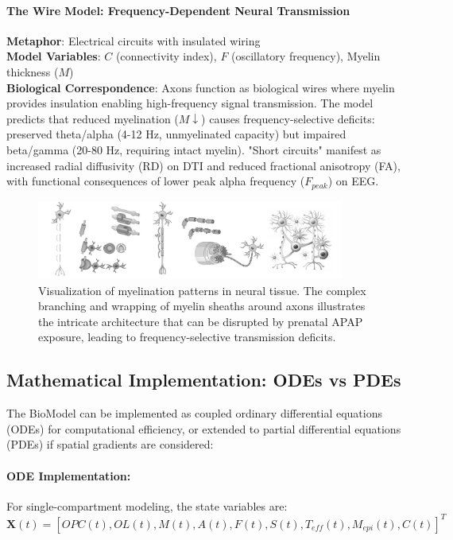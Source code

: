 \documentclass[11pt]{article}
\let\oldsubsection\subsection
\renewcommand{\subsection}[1]{\oldsubsection{#1}\setlength{\leftskip}{0.75em}}
\begin{document}
\paragraph{The Wire Model: Frequency-Dependent Neural Transmission}
\textbf{Metaphor}: Electrical circuits with insulated wiring\\
\textbf{Model Variables}: $C$ (connectivity index), $F$ (oscillatory frequency), Myelin thickness ($M$)\\
\textbf{Biological Correspondence}: Axons function as biological wires where myelin provides insulation enabling high-frequency signal transmission. The model predicts that reduced myelination ($M \downarrow$) causes frequency-selective deficits: preserved theta/alpha (4-12 Hz, unmyelinated capacity) but impaired beta/gamma (20-80 Hz, requiring intact myelin). "Short circuits" manifest as increased radial diffusivity (RD) on DTI and reduced fractional anisotropy (FA), with functional consequences of lower peak alpha frequency ($F_{peak}$) on EEG.


\begin{figure}[h]
\centering
\includegraphics[width=0.9\textwidth]{../assets/mylination.jpg}
\caption{Visualization of myelination patterns in neural tissue. The complex branching and wrapping of myelin sheaths around axons illustrates the intricate architecture that can be disrupted by prenatal APAP exposure, leading to frequency-selective transmission deficits.}
\label{fig:mylination}
\end{figure}



\subsection{Mathematical Implementation: ODEs vs PDEs}

The BioModel can be implemented as coupled ordinary differential equations (ODEs) for computational efficiency, or extended to partial differential equations (PDEs) if spatial gradients are considered:

\paragraph{ODE Implementation:}
For single-compartment modeling, the state variables are:
\begin{equation}
\mathbf{X}(t) = [OPC(t), OL(t), M(t), A(t), F(t), S(t), T_{eff}(t), M_{epi}(t), C(t)]^T
\end{equation}
\end{document}
